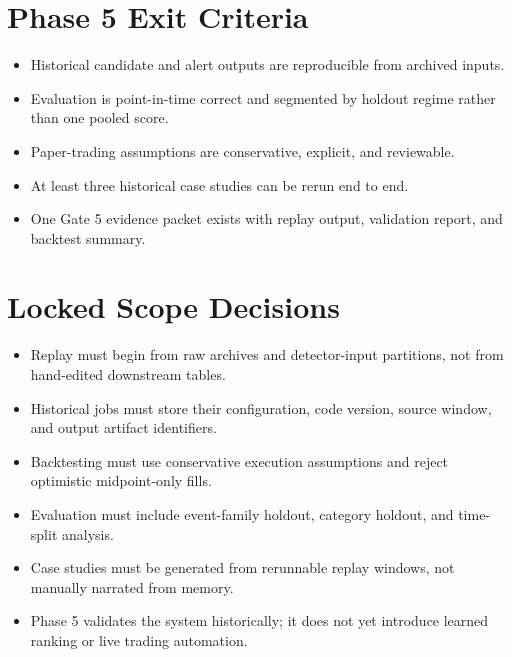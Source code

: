 \documentclass{article}
\begin{document}
\section*{Phase 5 Exit Criteria}
\begin{itemize}
\item Historical candidate and alert outputs are reproducible from archived inputs.
\item Evaluation is point-in-time correct and segmented by holdout regime rather than one pooled score.
\item Paper-trading assumptions are conservative, explicit, and reviewable.
\item At least three historical case studies can be rerun end to end.
\item One Gate 5 evidence packet exists with replay output, validation report, and backtest summary.
\end{itemize}

\section*{Locked Scope Decisions}
\begin{itemize}
\item Replay must begin from raw archives and detector-input partitions, not from hand-edited downstream tables.
\item Historical jobs must store their configuration, code version, source window, and output artifact identifiers.
\item Backtesting must use conservative execution assumptions and reject optimistic midpoint-only fills.
\item Evaluation must include event-family holdout, category holdout, and time-split analysis.
\item Case studies must be generated from rerunnable replay windows, not manually narrated from memory.
\item Phase 5 validates the system historically; it does not yet introduce learned ranking or live trading automation.
\end{itemize}
\end{document}
